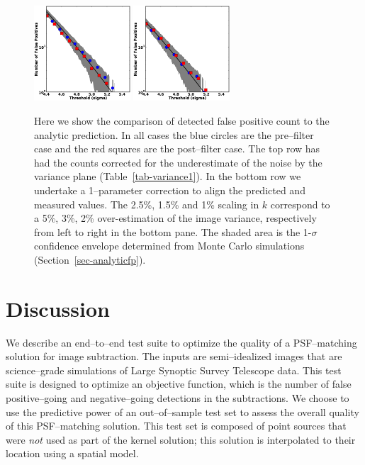 \documentclass[floatfix, apj]{emulateapj}
\begin{document}
\begin{figure}[!ht]
  \includegraphics[width=0.32\textwidth]{fig4e.eps}
  \includegraphics[width=0.32\textwidth]{fig4f.eps} \\
  \caption{Here we show the comparison of detected false positive
    count to the analytic prediction.
    In all cases the blue circles are the pre--filter case and the red
    squares are the post--filter case.
    The top row has had the counts corrected for the underestimate of
    the noise by the variance plane (Table~\ref{tab-variance1}).
    In the bottom row we undertake a 1--parameter correction to align
    the predicted and measured values.
    The 2.5\%, 1.5\% and 1\% scaling in $k$ correspond to a 5\%, 3\%,
    2\% over-estimation of the image variance, respectively from left
    to right in the bottom pane. 
    The shaded area is the 1-$\sigma$ confidence envelope determined
    from Monte Carlo simulations (Section~\ref{sec-analyticfp}).}
\label{fig:4}
\end{figure}

\section{Discussion}

We describe an end--to--end test suite to optimize the quality of a PSF--matching solution for image subtraction.
The inputs are semi--idealized images that are science--grade simulations of Large Synoptic Survey Telescope data.
This test suite is designed to optimize an objective function, which is the number of false positive--going and negative--going detections in the subtractions.
We choose to use the predictive power of an out--of--sample test set to assess the overall quality of this PSF--matching solution.
This test set is composed of point sources that were {\it not} used as part of the kernel solution; this solution is interpolated to their location using a spatial model.
\end{document}
